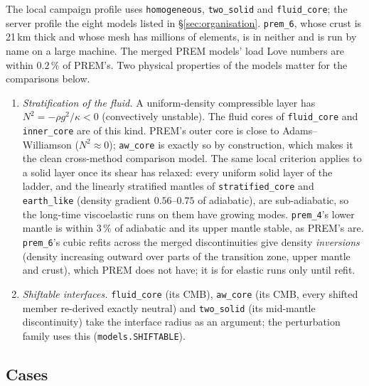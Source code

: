 \documentclass[11pt]{article}
\numberwithin{equation}{section}
\newcommand{\code}[1]{\texttt{#1}}
\begin{document}
\noindent The local campaign profile uses \code{homogeneous},
\code{two\_solid} and \code{fluid\_core}; the server profile the eight
models listed in \S\ref{sec:organisation}. \code{prem\_6}, whose crust is
21\,km thick and whose mesh has millions of elements, is in neither and is
run by name on a large machine. The merged PREM models' load Love numbers
are within $0.2\,\%$ of PREM's. Two physical properties of the models
matter for the comparisons below.
\begin{enumerate}[leftmargin=*]
\item \emph{Stratification of the fluid.} A uniform-density compressible
  layer has $N^2=-\rho g^2/\kappa<0$ (convectively unstable). The fluid
  cores of \code{fluid\_core} and \code{inner\_core} are of this kind.
  PREM's outer core is close to Adams--Williamson ($N^2\approx 0$);
  \code{aw\_core} is exactly so by construction, which makes it the
  clean cross-method comparison model. The same local criterion applies
  to a solid layer once its shear has relaxed: every uniform solid layer
  of the ladder, and the linearly stratified mantles of
  \code{stratified\_core} and \code{earth\_like} (density gradient
  $0.56$--$0.75$ of adiabatic), are sub-adiabatic, so the long-time
  viscoelastic runs on them have growing modes. \code{prem\_4}'s lower
  mantle is within $3\,\%$ of adiabatic and its upper mantle stable, as
  PREM's are. \code{prem\_6}'s cubic refits across the merged
  discontinuities give density \emph{inversions} (density increasing
  outward over parts of the transition zone, upper mantle and crust),
  which PREM does not have; it is for elastic runs only until refit.
\item \emph{Shiftable interfaces.} \code{fluid\_core} (its CMB),
  \code{aw\_core} (its CMB, every shifted member re-derived exactly
  neutral) and \code{two\_solid} (its mid-mantle discontinuity) take
  the interface radius as an argument; the perturbation family uses
  this (\code{models.SHIFTABLE}).
\end{enumerate}

\subsection{Cases}
\label{sec:cases}
\end{document}
